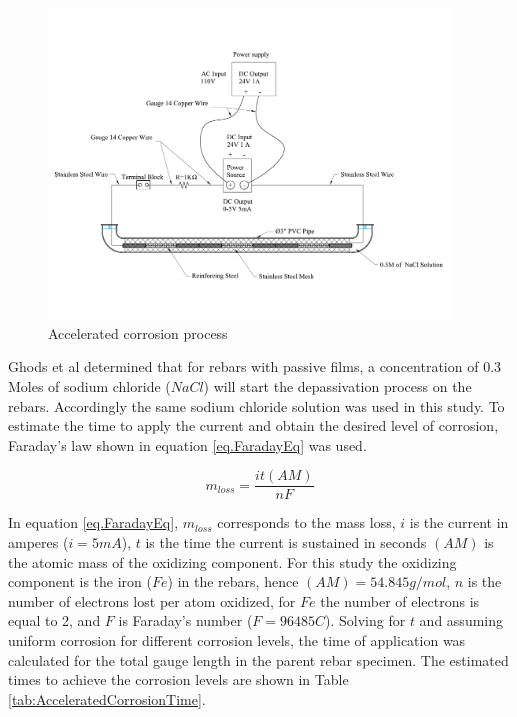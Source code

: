 \begin{figure}[htbp]
	\centering
	\includegraphics[width=0.95\textwidth]{Chapter-3/figs/AcceleratedCorrosionProcedure}
	\caption{Accelerated corrosion process}
	\label{fig:AcceleratedCorrosion}
\end{figure}

Ghods et al \cite{Ghods2010} determined that for rebars with passive films, a concentration of 0.3 Moles of sodium chloride ($NaCl$) will start the depassivation process on the rebars. Accordingly the same sodium chloride solution was used in this study. To estimate the time to apply the current and obtain the desired level of corrosion,  Faraday's law shown in equation \ref{eq.FaradayEq} was used.

\begin{equation}
	m_{loss}=\frac{it(AM)}{nF}
	\label{eq.FaradayEq}
\end{equation}

 In equation \ref{eq.FaradayEq}, $m_{loss}$ corresponds to the mass loss, $i$ is the current in amperes ($i=5 mA$), $t$ is the time the current is sustained in seconds $(AM)$ is the atomic mass of the oxidizing component. For this study the oxidizing component is the iron ($Fe$) in the rebars, hence $(AM)=54.845g/mol$, $n$ is the number of electrons lost per atom oxidized, for $Fe$ the number of electrons is equal to 2, and $F$ is Faraday's number ($F=96485 C$). Solving  for $t$ and assuming uniform corrosion for different corrosion levels, the time of application was calculated for the total gauge length in the parent rebar specimen. The estimated times to achieve the corrosion levels are shown in Table \ref{tab:AcceleratedCorrosionTime}. 

